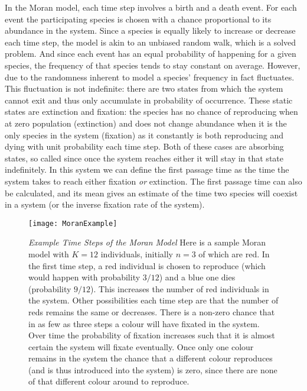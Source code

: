 In the Moran model, each time step involves a birth and a death event.
For each event the participating species is chosen with a chance proportional to its abundance in the system. 
Since a species is equally likely to increase or decrease each time step, the model is akin to an unbiased random walk, which is a solved problem. %
And since each event has an equal probability of happening for a given species, the frequency of that species tends to stay constant on average. 
However, due to the randomness inherent to model a species' frequency in fact fluctuates. 
This fluctuation is not indefinite: there are two states from which the system cannot exit and thus only accumulate in probability of occurrence. 
These static states are extinction and fixation: the species has no chance of reproducing when at zero population (extinction) and does not change abundance when it is the only species in the system (fixation) as it constantly is both reproducing and dying with unit probability each time step. 
Both of these cases are absorbing states, so called since once the system reaches either it will stay in that state indefinitely. 
In this system we can define the first passage time as the time the system takes to reach either fixation \emph{or} extinction. 
The first passage time can also be calculated, and its mean gives an estimate of the time two species will coexist in a system (or the inverse fixation rate of the system). 

\begin{figure}[ht!]
	\centering
	\texttt{[image: MoranExample]}
	\caption{\emph{Example Time Steps of the Moran Model} Here is a sample Moran model with $K=12$ individuals, initially $n=3$ of which are red. In the first time step, a red individual is chosen to reproduce (which would happen with probability $3/12$) and a blue one dies (probability $9/12$). This increases the number of red individuals in the system. Other possibilities each time step are that the number of reds remains the same or decreases. There is a non-zero chance that in as few as three steps a colour will have fixated in the system. Over time the probability of fixation increases such that it is almost certain the system will fixate eventually. Once only one colour remains in the system the chance that a different colour reproduces (and is thus introduced into the system) is zero, since there are none of that different colour around to reproduce. }
\end{figure}

